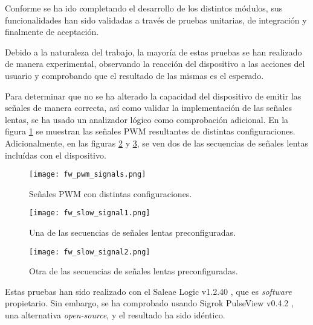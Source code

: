 Conforme se ha ido completando el desarrollo de los distintos módulos, sus funcionalidades han sido validadas a través de pruebas unitarias, de integración y finalmente de aceptación.

Debido a la naturaleza del trabajo, la mayoría de estas pruebas se han realizado de manera experimental, observando la reacción del dispositivo a las acciones del usuario y comprobando que el resultado de las mismas es el esperado.

Para determinar que no se ha alterado la capacidad del dispositivo de emitir las señales de manera correcta, así como validar la implementación de las señales lentas, se ha usado un analizador lógico como comprobación adicional. En la figura \ref{fig:fw_pwm_signals} se muestran las señales PWM resultantes de distintas configuraciones. Adicionalmente, en las figuras \ref{fig:fw_slow_signal1} y \ref{fig:fw_slow_signal2}, se ven dos de las secuencias de señales lentas incluídas con el dispositivo.

\begin{figure}[h!]
    \centering
    \texttt{[image: fw\_pwm\_signals.png]}
    \caption{Señales PWM con distintas configuraciones.}
    \label{fig:fw_pwm_signals}
\end{figure}

\begin{figure}[h!]
    \centering
    \texttt{[image: fw\_slow\_signal1.png]}
    \caption{Una de las secuencias de señales lentas preconfiguradas.}
    \label{fig:fw_slow_signal1}
\end{figure}

\begin{figure}[h!]
    \centering
    \texttt{[image: fw\_slow\_signal2.png]}
    \caption{Otra de las secuencias de señales lentas preconfiguradas.}
    \label{fig:fw_slow_signal2}
\end{figure}

Estas pruebas han sido realizado con el Saleae Logic v1.2.40 \cite{saleae-logic}, que es \textit{software} propietario. Sin embargo, se ha comprobado usando Sigrok PulseView v0.4.2 \cite{sigrok-pv}, una alternativa \textit{open-source}, y el resultado ha sido idéntico.
